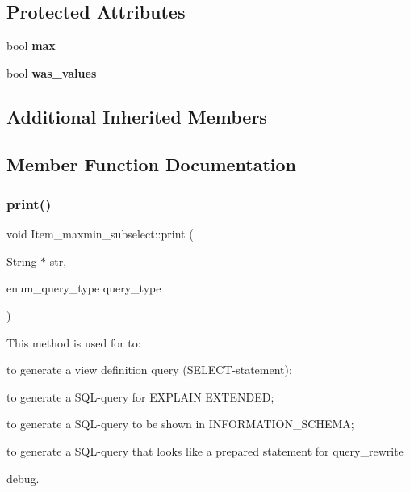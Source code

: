 \subsection*{Protected Attributes}
\begin{DoxyCompactItemize}
\item 
\mbox{\label{classItem__maxmin__subselect_a4cf43454eeb7810a11ab2011e79cbe3b}} 
bool {\bfseries max}
\item 
\mbox{\label{classItem__maxmin__subselect_ae5f3b77efab0ec19e24a682a34c3865c}} 
bool {\bfseries was\+\_\+values}
\end{DoxyCompactItemize}
\subsection*{Additional Inherited Members}


\subsection{Member Function Documentation}
\mbox{\label{classItem__maxmin__subselect_ad03a1c165ac9ec019b5c7e80f108cddd}} 
\subsubsection{\texorpdfstring{print()}{print()}}
{\footnotesize\ttfamily void Item\+\_\+maxmin\+\_\+subselect\+::print (\begin{DoxyParamCaption}\item[{String $\ast$}]{str,  }\item[{enum\+\_\+query\+\_\+type}]{query\+\_\+type }\end{DoxyParamCaption})\hspace{0.3cm}{\ttfamily [virtual]}}

This method is used for to\+:
\begin{DoxyItemize}
\item to generate a view definition query (S\+E\+L\+E\+CT-\/statement);
\item to generate a S\+QL-\/query for E\+X\+P\+L\+A\+IN E\+X\+T\+E\+N\+D\+ED;
\item to generate a S\+QL-\/query to be shown in I\+N\+F\+O\+R\+M\+A\+T\+I\+O\+N\+\_\+\+S\+C\+H\+E\+MA;
\item to generate a S\+QL-\/query that looks like a prepared statement for query\+\_\+rewrite
\item debug.
\end{DoxyItemize}

